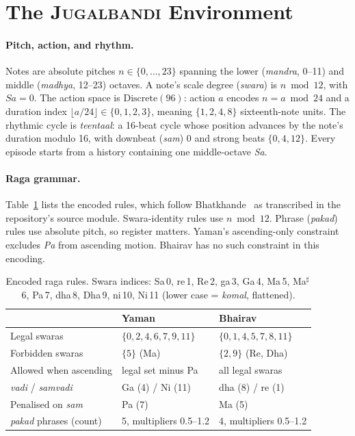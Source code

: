 \documentclass[11pt]{article}
\newcommand{\env}{\textsc{Jugalbandi}}
\newcommand{\sw}[1]{\textit{#1}}  %
\begin{document}
\section{The \env{} Environment}
\label{sec:env}

\paragraph{Pitch, action, and rhythm.} Notes are absolute pitches $n \in \{0,\dots,23\}$ spanning the lower (\sw{mandra}, 0--11) and middle (\sw{madhya}, 12--23) octaves. A note's scale degree (\sw{swara}) is $n \bmod 12$, with $\sw{Sa}=0$. The action space is $\mathrm{Discrete}(96)$: action $a$ encodes $n = a \bmod 24$ and a duration index $\lfloor a/24 \rfloor \in \{0,1,2,3\}$, meaning $\{1,2,4,8\}$ sixteenth-note units. The rhythmic cycle is \sw{teentaal}: a 16-beat cycle whose position advances by the note's duration modulo 16, with downbeat (\sw{sam}) 0 and strong beats $\{0,4,12\}$. Every episode starts from a history containing one middle-octave \sw{Sa}.

\paragraph{Raga grammar.} Table~\ref{tab:ragas} lists the encoded rules, which follow Bhatkhande~\citep{bhatkhande_kpm} as transcribed in the repository's source module. Swara-identity rules use $n \bmod 12$. Phrase (\sw{pakad}) rules use absolute pitch, so register matters. Yaman's ascending-only constraint excludes \sw{Pa} from ascending motion. Bhairav has no such constraint in this encoding.

\begin{table}[t]
\centering\small
\caption{Encoded raga rules. Swara indices: Sa\,0, re\,1, Re\,2, ga\,3, Ga\,4, Ma\,5, Ma$^\sharp$\,6, Pa\,7, dha\,8, Dha\,9, ni\,10, Ni\,11 (lower case = \sw{komal}, flattened).}
\label{tab:ragas}
\begin{tabular}{@{}lll@{}}
\toprule
 & Yaman & Bhairav \\
\midrule
Legal swaras & $\{0,2,4,6,7,9,11\}$ & $\{0,1,4,5,7,8,11\}$ \\
Forbidden swaras & $\{5\}$ (Ma) & $\{2,9\}$ (Re, Dha) \\
Allowed when ascending & legal set minus Pa & all legal swaras \\
\sw{vadi} / \sw{samvadi} & Ga (4) / Ni (11) & dha (8) / re (1) \\
Penalised on \sw{sam} & Pa (7) & Ma (5) \\
\sw{pakad} phrases (count) & 5, multipliers 0.5--1.2 & 4, multipliers 0.5--1.2 \\
\bottomrule
\end{tabular}
\end{table}
\end{document}
